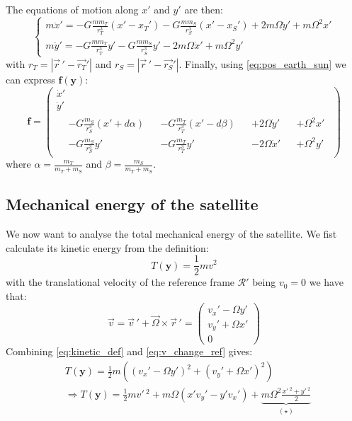 The equations of motion along \(x'\) and \(y'\) are then:
\begin{equation}
    \begin{cases}
        m \ddot x' = -G \frac{m m_T}{r_T^3} (x' - x_T')
        - G \frac{m m_S}{r_S^3} (x' - x_S')
        + 2 m \Omega \dot y'
        + m \Omega^2 x' \\
        m \ddot y' = -G \frac{m m_T}{r_T^3} y'
        - G \frac{m m_S}{r_S^3} y'
        - 2 m \Omega \dot x'
        + m \Omega^2 y'
    \end{cases}
\end{equation}
with \(r_T = |\vec{r}\,' - \vec{r_T}'|\) and \(r_S = |\vec{r}\,' - \vec{r_S}'|\). Finally, using \autoref{eq:pos_earth_sun} we can express \(\mathbf f(\mathbf y)\):
\begin{equation}
    \mathbf f = \left(\begin{gathered}
        \dot x' \\
        \dot y' \\
        \begin{aligned}
            &-G \frac{m_S}{r_S^3} (x' + d \alpha) &&- G \frac{m_T}{r_T^3} (x' - d \beta) &&+ 2 \Omega \dot y' &&+ \Omega^2 x' \\
            &-G \frac{m_S}{r_S^3} y' &&-G \frac{m_T}{r_T^3} y' &&- 2 \Omega \dot x' &&+ \Omega^2 y'
        \end{aligned}
    \end{gathered}\right)
\end{equation}
where \(\alpha = \frac{m_T}{m_T + m_S}\) and \(\beta = \frac{m_S}{m_T + m_S}\).

\subsection{Mechanical energy of the satellite}
We now want to analyse the total mechanical energy of the satellite. We fist calculate its kinetic energy from the definition:
\begin{equation}
    T(\mathbf{y}) = \frac{1}{2}m v^2
    \label{eq:kinetic_def}
\end{equation}
with the translational velocity of the reference frame $\mathcal{R}'$ being $v_0 = 0$ we have that:
\begin{equation}
    \vec{v} = \vec{v}\,' + \vec{\Omega}\times\vec{r}\,' = \left(\begin{matrix} v_x' - \Omega y' \\ v_y' + \Omega x' \\ 0 \end{matrix}\right)
    \label{eq:v_change_ref}
\end{equation}
Combining \autoref{eq:kinetic_def} and \autoref{eq:v_change_ref} gives:
\begin{equation}
    \begin{aligned}
        & T(\mathbf{y}) = \frac{1}{2}m\left((v_x' - \Omega y')^2 + (v_y' + \Omega x')^2\right) \\
        & \Rightarrow T(\mathbf{y}) = \frac{1}{2}mv'\,^2 + m\Omega(x'v_y' - y'v_x') + \underbrace{m\Omega^2\frac{x'\,^2 + y'\,^2}{2}}_{(\star)}
    \end{aligned}
    \label{eq:kinetic_frame_rot}
\end{equation}

